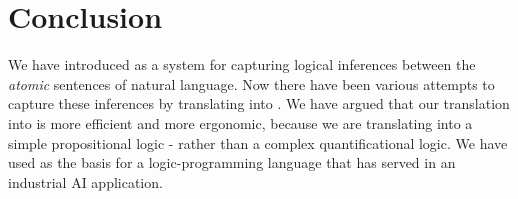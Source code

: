 \section{Conclusion}\label{conclusion}

We have introduced \Cathoristic{} as a system for capturing logical inferences between the \emph{atomic} sentences of natural language.
Now there have been various attempts to capture these inferences by translating into \fol{}.
We have argued that our translation into \Cathoristic{} is more efficient and more ergonomic, because we are translating into a simple propositional logic - rather than a complex quantificational logic.
We have used \Cathoristic{} as the basis for a logic-programming language that has served in an industrial AI application.

